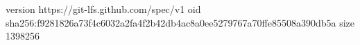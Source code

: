 version https://git-lfs.github.com/spec/v1
oid sha256:f9281826a73f4c6032a2fa4f2b42db4ac8a0ee5279767a70ffe85508a390db5a
size 1398256
